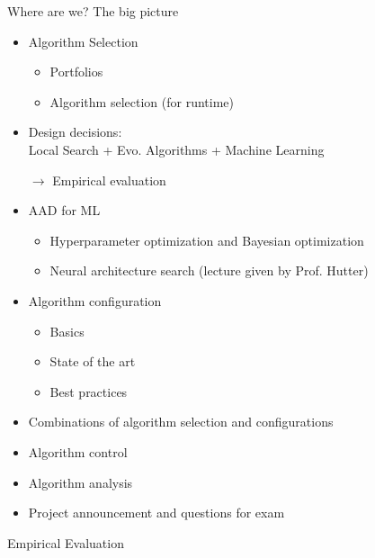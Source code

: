 \newcommand{\answer}[1]{\textcolor{black}{#1}}

\newcommand{\rt}{T}
\newcommand{\RT}{T}
\newcommand{\sq}{Q}
\newcommand{\SQ}{Q}
\newcommand{\sr}{r}
\begin{frame}[c]{Where are we? The big picture}

\begin{itemize}
\item Algorithm Selection
  \begin{itemize}
    \item Portfolios
    \item Algorithm selection (for runtime)
  \end{itemize}
  \item Design decisions:\\ Local Search + Evo. Algorithms + Machine Learning 
  \item[$\to$] Empirical evaluation
  \item AAD for ML
  \begin{itemize}
    \item Hyperparameter optimization and Bayesian optimization 
    \item Neural architecture search (lecture given by Prof. Hutter)
  \end{itemize}
  \item Algorithm configuration 
  \begin{itemize}
    \item Basics 
    \item State of the art 
    \item Best practices 
  \end{itemize}
  \item Combinations of algorithm selection and configurations
  \item Algorithm control 
  \item Algorithm analysis 
  \item Project announcement and questions for exam 
\end{itemize}

\end{frame}
\begin{frame}[c]{}

\centering
\huge
Empirical Evaluation

\end{frame}
